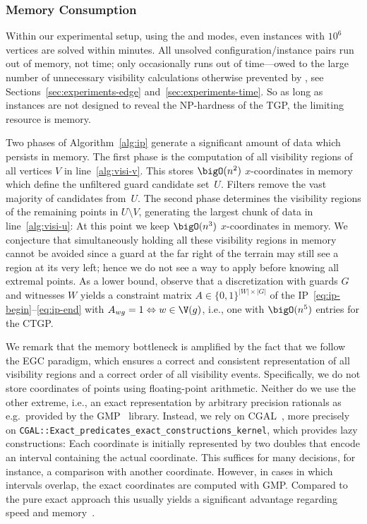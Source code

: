 \subsubsection{Memory Consumption}
\label{sec:experiments-memory}

Within our experimental setup, using the \vdefault and \pdefault modes, even instances with $10^6$ vertices are solved within minutes.
All unsolved configuration/instance pairs run out of memory, not time;
only \pnoedge occasionally runs out of time\dash---owed to the large number of unnecessary visibility calculations otherwise prevented by \pointguardfilter, see Sections~\ref{sec:experiments-edge} and~\ref{sec:experiments-time}.
So as long as instances are not designed to reveal the NP-hardness of the \ac{TGP}, the limiting resource is memory.

Two phases of Algorithm~\ref{alg:ip} generate a significant amount of data which persists in memory.
The first phase is the computation of all visibility regions of all vertices $V$ in line~\ref{alg:visi-v}.
This stores $\bigO(n^2)$ $x$-coordinates in memory which define the unfiltered guard candidate set~$U$.
Filters remove the vast majority of candidates from~$U$.
The second phase determines the visibility regions of the remaining points in $U \setminus V$, generating the largest chunk of data in line~\ref{alg:visi-u}:
At this point we keep $\bigO(n^3)$ $x$-coordinates in memory.
We conjecture that simultaneously holding all these visibility regions in memory cannot be avoided since a guard at the far right of the terrain may still see a region at its very left;
hence we do not see a way to apply \witnessfilter before knowing all extremal points.
As a lower bound, observe that a discretization with guards $G$ and witnesses $W$ yields a constraint matrix $A \in \{0,1\}^{|W| \times |G|}$ of the \acs{IP}~\eqref{eq:ip-begin}--\eqref{eq:ip-end} with $A_{wg} = 1 \Leftrightarrow w \in \V(g)$, i.e., one with $\bigO(n^5)$ entries for the \ac{CTGP}.

We remark that the memory bottleneck is amplified by the fact that we follow the \ac{EGC} paradigm, which ensures a correct and consistent representation of all visibility regions and a correct order of all visibility events.
Specifically, we do not store coordinates of points using floating-point arithmetic.
Neither do we use the other extreme, i.e., an exact representation by arbitrary precision rationals as e.g.\ provided by the GMP~\cite{gmp} library.
Instead, we rely on \ac{CGAL}~\cite{cgal}, more precisely on \texttt{CGAL::Exact\_predicates\_exact\_constructions\_kernel}, which provides lazy constructions:
Each coordinate is initially represented by two doubles that encode an interval containing the actual coordinate.
This suffices for many decisions, for instance, a comparison with another coordinate.
However, in cases in which intervals overlap, the exact coordinates are computed with GMP.
Compared to the pure exact approach this usually yields a significant advantage regarding speed and memory~\cite{pf-aglesfegc-2011}.
